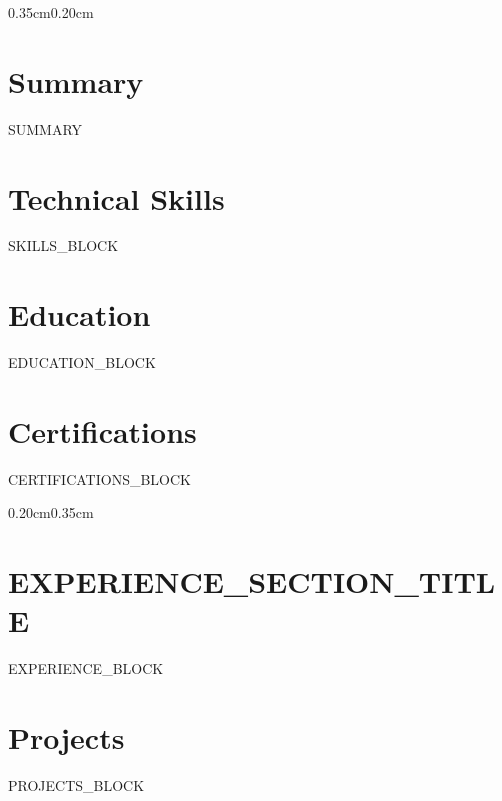 \documentclass[10pt, letterpaper]{article}
\begin{document}
\noindent
\begin{minipage}[t]{0.33\textwidth}
\vspace{0pt}
\begin{adjustwidth}{0.35cm}{0.20cm}

\section*{Summary}
{\small {{SUMMARY}}}

\vspace{5pt}

\section*{Technical Skills}
{{SKILLS_BLOCK}}

\vspace{5pt}

\section*{Education}
{{EDUCATION_BLOCK}}

\vspace{5pt}

\section*{Certifications}
\begin{itemize}[leftmargin=1.0em, label={\textcolor{accent}{\tiny$\blacksquare$}}, itemsep=4pt]
    \small
    {{CERTIFICATIONS_BLOCK}}
\end{itemize}

\end{adjustwidth}
\end{minipage}%
\hfill
\begin{minipage}[t]{0.64\textwidth}
\vspace{0pt}
\begin{adjustwidth}{0.20cm}{0.35cm}

\section*{{{EXPERIENCE_SECTION_TITLE}}}
{{EXPERIENCE_BLOCK}}

\vspace{8pt}

\section*{Projects}
{{PROJECTS_BLOCK}}

\end{adjustwidth}
\end{minipage}
\end{document}
